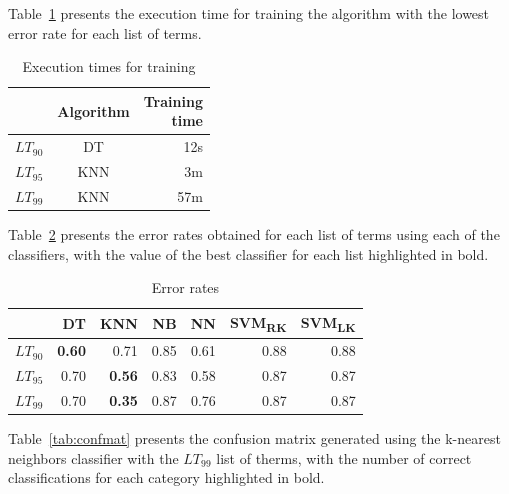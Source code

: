 \documentclass[conference]{IEEEtran}
\begin{document}
Table~\ref{tab:exectime} presents the execution time for training the
algorithm with the lowest error rate for each list of terms.

\begin{table}[htbp]
    \caption{Execution times for training}
\begin{center}
\begin{tabular}{l|cr}
    & Algorithm  & \parbox{3em}{\centering Training\\time} \\\hline
    $LT_{90}$    & DT         & 12s  \\
    $LT_{95}$    & KNN        &  3m  \\
    $LT_{99}$    & KNN        & 57m  \\
\end{tabular}
\label{tab:exectime}
\end{center}
\end{table}


Table~\ref{tab:error} presents the error rates obtained for each list
of terms using each of the classifiers, with the value of the best
classifier for each list highlighted in bold.

\begin{table}[htbp]
    \caption{Error rates}
\begin{center}
\begin{tabular}{l|rrrrrr}
                 & DT            & KNN           & NB   & NN   & SVM\textsubscript{RK} & SVM\textsubscript{LK} \\ \hline
    $LT_{90}$    & \textbf{0.60} & 0.71          & 0.85 & 0.61 & 0.88                  & 0.88                  \\
    $LT_{95}$    & 0.70          & \textbf{0.56} & 0.83 & 0.58 & 0.87                  & 0.87                  \\
    $LT_{99}$    & 0.70          & \textbf{0.35} & 0.87 & 0.76 & 0.87                  & 0.87                  \\
\end{tabular}
\label{tab:error}
\end{center}
\end{table}

Table~\ref{tab:confmat} presents the confusion matrix generated using
the k-nearest neighbors classifier with the $LT_{99}$ list of therms,
with the number of correct classifications for each category
highlighted in bold.
\end{document}
